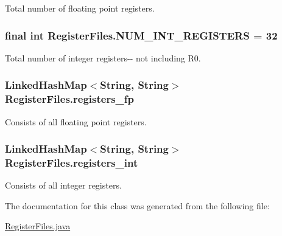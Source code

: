 \-Total number of floating point registers. 

\hypertarget{classRegisterFiles_acddf439e364d3aae0d80304b9a48cddc}{
\subsubsection[{\-N\-U\-M\-\_\-\-I\-N\-T\-\_\-\-R\-E\-G\-I\-S\-T\-E\-R\-S}]{\setlength{\rightskip}{0pt plus 5cm}final int {\bf \-Register\-Files.\-N\-U\-M\-\_\-\-I\-N\-T\-\_\-\-R\-E\-G\-I\-S\-T\-E\-R\-S} = 32}}\label{classRegisterFiles_acddf439e364d3aae0d80304b9a48cddc}


\-Total number of integer registers-\/-\/ not including \-R0. 

\hypertarget{classRegisterFiles_ad4dcec0be4e24ff005b848d953a3c73b}{
\subsubsection[{registers\-\_\-fp}]{\setlength{\rightskip}{0pt plus 5cm}\-Linked\-Hash\-Map$<$\-String, \-String$>$ {\bf \-Register\-Files.\-registers\-\_\-fp}}}\label{classRegisterFiles_ad4dcec0be4e24ff005b848d953a3c73b}


\-Consists of all floating point registers. 

\hypertarget{classRegisterFiles_af43eb5d927643c8bf16eb474ca153fdd}{
\subsubsection[{registers\-\_\-int}]{\setlength{\rightskip}{0pt plus 5cm}\-Linked\-Hash\-Map$<$\-String, \-String$>$ {\bf \-Register\-Files.\-registers\-\_\-int}}}\label{classRegisterFiles_af43eb5d927643c8bf16eb474ca153fdd}


\-Consists of all integer registers. 



\-The documentation for this class was generated from the following file\-:\begin{DoxyCompactItemize}
\item 
\hyperlink{RegisterFiles_8java}{\-Register\-Files.\-java}\end{DoxyCompactItemize}
